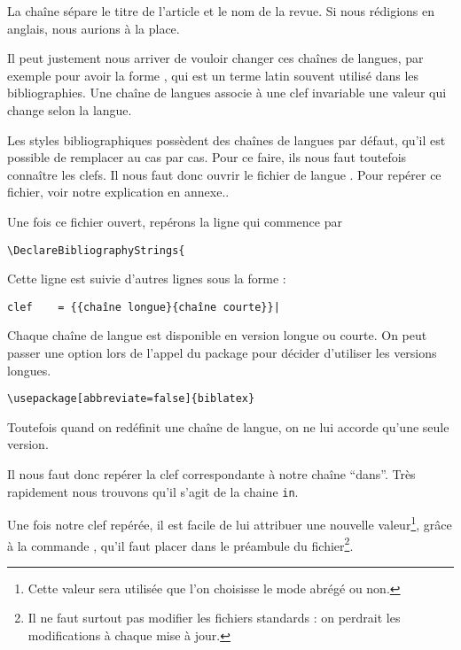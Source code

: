 	 
	 
	\begin{quotation}
		\cite{Junod1992}
	\end{quotation}
	
	La chaîne  sépare le titre de l'article et le nom de la revue. Si nous rédigions en anglais, nous aurions  à la place.  
	
	Il peut justement nous arriver de vouloir changer ces chaînes de langues, par exemple pour avoir la forme , qui est un terme latin souvent utilisé dans les bibliographies. Une chaîne de langues associe à une clef invariable une valeur qui change selon la langue.
	
	Les styles bibliographiques possèdent des chaînes de langues par défaut, qu'il est possible de remplacer au cas par cas. Pour ce faire, ils nous faut toutefois connaître les clefs. Il nous faut donc ouvrir le fichier de langue . Pour repérer ce fichier, voir notre explication en annexe..
	
	Une fois ce fichier ouvert, repérons la ligne qui commence par
	
	\begin{verbatim}
\DeclareBibliographyStrings{
	\end{verbatim}
	
	Cette ligne est suivie d'autres lignes sous la forme :
	
	\begin{verbatim}
clef	= {{chaîne longue}{chaîne courte}}|
	\end{verbatim}
	
	\begin{anedocte}
	Chaque chaîne de langue est disponible en version longue ou courte. On peut passer une option lors de l'appel du package  pour décider d'utiliser les versions longues.
	
	\begin{verbatim}
\usepackage[abbreviate=false]{biblatex}
	\end{verbatim}
	
	 Toutefois quand on redéfinit une chaîne de langue, on ne lui accorde qu'une seule version.
	
	\end{anedocte}
	Il nous faut donc repérer la clef correspondante à notre chaîne \enquote{dans}. Très rapidement nous trouvons qu'il s'agit de la chaine \verb|in|.
	
	Une fois  notre clef repérée, il est facile de lui attribuer une nouvelle valeur\footnote{Cette valeur sera utilisée que l'on choisisse le mode abrégé ou non.}, grâce à la commande , qu'il faut placer dans le préambule du fichier\footnote{Il ne faut surtout pas modifier les fichiers standards : on perdrait les modifications à chaque mise à jour.}.
	
